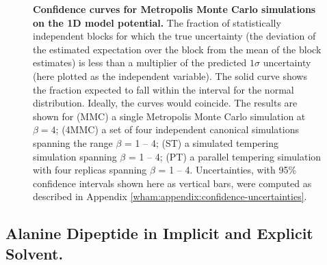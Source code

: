 \begin{figure}[tb]
  \begin{center}
  \end{center}
  \caption{{\bf Confidence curves for Metropolis Monte Carlo simulations on the 1D model potential.}  The fraction of statistically independent blocks for which the true uncertainty (the deviation of the estimated expectation over the block from the mean of the block estimates) is less than a multiplier of the predicted $1\sigma$ uncertainty (here plotted as the independent variable).  The solid curve shows the fraction expected to fall within the interval for the normal distribution.  Ideally, the curves would coincide.  The results are shown for (MMC) a single Metropolis Monte Carlo simulation at $\beta = 4$; (4MMC) a set of four independent canonical simulations spanning the range $\beta$ = 1 -- 4; (ST) a simulated tempering simulation spanning $\beta$ = 1 -- 4; (PT) a parallel tempering simulation with four replicas spanning $\beta$ = 1 -- 4.  Uncertainties, with 95\% confidence intervals shown here as vertical bars, were computed as described in Appendix \ref{wham:appendix:confidence-uncertainties}.}
  \label{wham:figure:1D-model-confidence-curves}
\end{figure}    

\subsection{Alanine Dipeptide in Implicit and Explicit Solvent.}
\label{wham:section:alanine-dipeptide-simulations}

